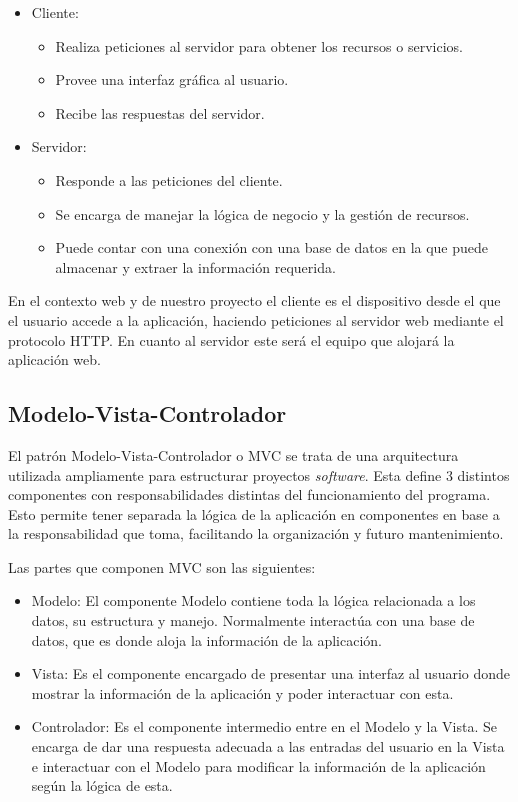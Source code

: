 \begin{itemize}
	\item Cliente:
	\begin{itemize}
		\item Realiza peticiones al servidor para obtener los recursos o servicios.
		\item Provee una interfaz gráfica al usuario.
		\item Recibe las respuestas del servidor.
	\end{itemize}
	\item Servidor:
	\begin{itemize}
		\item Responde a las peticiones del cliente.
		\item Se encarga de manejar la lógica de negocio y la gestión de recursos.
		\item Puede contar con una conexión con una base de datos en la que puede almacenar y extraer la información requerida.
	\end{itemize}
\end{itemize}


En el contexto web y de nuestro proyecto el cliente es el dispositivo desde el que el usuario accede a la aplicación, haciendo peticiones al servidor web mediante el protocolo HTTP. En cuanto al servidor este será el equipo que alojará la aplicación web.
\subsection{Modelo-Vista-Controlador}

El patrón Modelo-Vista-Controlador o MVC se trata de una arquitectura utilizada ampliamente para estructurar proyectos \textit{software}. Esta define 3 distintos componentes con responsabilidades distintas del funcionamiento del programa. Esto permite tener separada la lógica de la aplicación en componentes en base a la responsabilidad que toma, facilitando la organización y futuro mantenimiento.


Las partes que componen MVC son las siguientes:
\begin{itemize}
	\item Modelo: El componente Modelo contiene toda la lógica relacionada a los datos, su estructura y manejo. Normalmente interactúa con una base de datos, que es donde aloja la información de la aplicación.
	\item Vista: Es el componente encargado de presentar una interfaz al usuario donde mostrar la información de la aplicación y poder interactuar con esta.
	\item Controlador: Es el componente intermedio entre en el Modelo y la Vista. Se encarga de dar una respuesta adecuada a las entradas del usuario en la Vista e interactuar con el Modelo para modificar la información de la aplicación según la lógica de esta. 
\end{itemize}

